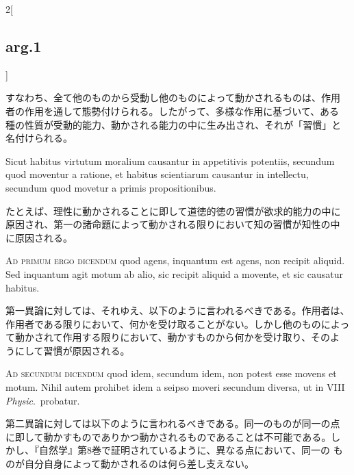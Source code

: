 \documentclass[paper=a4paper,fontsize=10pt,jafontsize=9pt,titlepage]{jlreq}
\begin{document}
\begin{paracol}{2}[\subsection{arg.1}]
\switchcolumn

すなわち、全て他のものから受動し他のものによって動かされるものは、作用
者の作用を通して態勢付けられる。したがって、多様な作用に基づいて、ある
種の性質が受動的能力、動かされる能力の中に生み出され、それが「習慣」と
名付けられる。

\switchcolumn*

Sicut habitus virtutum moralium causantur in appetitivis potentiis,
secundum quod moventur a ratione, et habitus scientiarum causantur in
intellectu, secundum quod movetur a primis propositionibus.

\switchcolumn

たとえば、理性に動かされることに即して道徳的徳の習慣が欲求的能力の中に
原因され、第一の諸命題によって動かされる限りにおいて知の習慣が知性の中
に原因される。

\switchcolumn*[\subsection{ad.1}]

{\scshape Ad primum ergo dicendum} quod agens, inquantum est agens,
non recipit aliquid. Sed inquantum agit motum ab alio, sic recipit
aliquid a movente, et sic causatur habitus.

\switchcolumn

第一異論に対しては、それゆえ、以下のように言われるべきである。作用者は、
作用者である限りにおいて、何かを受け取ることがない。しかし他のものによっ
て動かされて作用する限りにおいて、動かすものから何かを受け取り、そのよ
うにして習慣が原因される。

\switchcolumn*[\subsection{ad.2}]

{\scshape Ad secundum dicendum} quod idem, secundum idem, non potest
esse movens et motum. Nihil autem prohibet idem a seipso moveri
secundum diversa, ut in VIII {\itshape Physic}.~probatur.

\switchcolumn

第二異論に対しては以下のように言われるべきである。同一のものが同一の点
に即して動かすものでありかつ動かされるものであることは不可能である。し
かし、『自然学』第8巻で証明されているように、異なる点において、同一の
ものが自分自身によって動かされるのは何ら差し支えない。

\switchcolumn*[\subsection{ad.3}]


\end{paracol}
\end{document}
